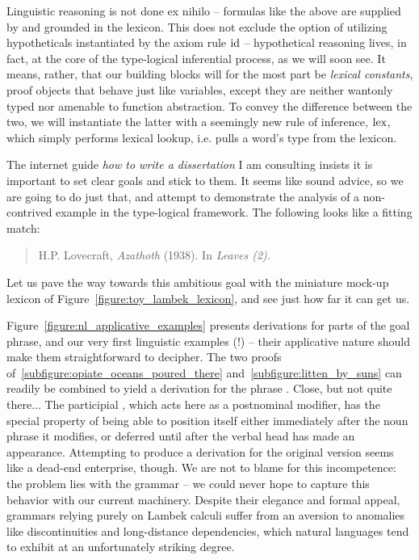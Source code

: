 Linguistic reasoning is not done ex nihilo -- formulas like the above are supplied by and grounded in the lexicon. 
This does not exclude the option of utilizing hypotheticals instantiated by the axiom rule $\mathrm{id}$ -- hypothetical reasoning lives, in fact, at the core of the type-logical inferential process, as we will soon see.
It means, rather, that our building blocks will for the most part be \textit{lexical constants}, proof objects that behave just like variables, except they are neither wantonly typed nor amenable to function abstraction.
To convey the difference between the two, we will instantiate the latter with a seemingly new rule of inference, $\mathrm{lex}$, which simply performs lexical lookup, i.e. pulls a word's type from the lexicon.

The internet guide \textit{how to write a dissertation} I am consulting insists it is important to set clear goals and stick to them.
It seems like sound advice, so we are going to do just that, and attempt to demonstrate the analysis of a non-contrived example in the type-logical framework.
The following looks like a fitting match:
\begin{quote}
\begin{flushright} H.P. Lovecraft, \textit{Azathoth}  (1938). In \textit{Leaves (2).}\end{flushright}
\end{quote}
Let us pave the way towards this ambitious goal with the miniature mock-up lexicon of Figure~\ref{figure:toy_lambek_lexicon}, and see just how far it can get us.

Figure~\ref{figure:nl_applicative_examples} presents derivations for parts of the goal phrase, and our very first linguistic examples (!) -- their applicative nature should make them straightforward to decipher.
The two proofs of~\ref{subfigure:opiate_oceans_poured_there} and~\ref{subfigure:litten_by_suns} can readily be combined to yield a derivation for the phrase . 
Close, but not quite there...
The participial , which acts here as a postnominal modifier, has the special property of being able to position itself either immediately after the noun phrase  it modifies, or deferred until after the verbal head  has made an appearance.
Attempting to produce a derivation for the original version seems like a dead-end enterprise, though.
We are not to blame for this incompetence: the problem lies with the grammar -- we could never hope to capture this behavior with our current machinery.
Despite their elegance and formal appeal, grammars relying purely on Lambek calculi suffer from an aversion to anomalies like discontinuities and long-distance dependencies, which natural languages tend to exhibit at an unfortunately striking degree.

